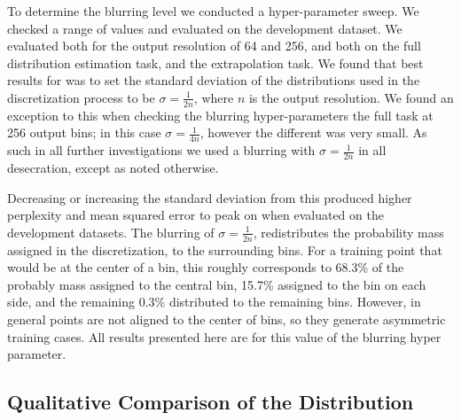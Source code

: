 \documentclass[11pt,letterpaper]{article}
\begin{document}
To determine the blurring level we conducted a hyper-parameter sweep.
We checked a range of values and evaluated on the development dataset.
We evaluated both for the output resolution of 64 and 256, and both on the full distribution estimation task, and the extrapolation task.
We found that best results for was to set the standard deviation of the distributions used in the discretization process to be $\sigma=\frac{1}{2n}$, where $n$ is the output resolution.
We found an exception to this when checking the blurring hyper-parameters the full task at 256 output bins; in this case $\sigma=\frac{1}{4n}$, however the different was very small.
As such in all further investigations we used a blurring with $\sigma=\frac{1}{2n}$ in all desecration, except as noted otherwise.

Decreasing or increasing the standard deviation from this produced higher perplexity and mean squared error to peak on when evaluated on the development datasets.
The blurring of $\sigma=\frac{1}{2n}$, redistributes the probability mass assigned in the discretization, to the surrounding bins.
For a training point that would be at the center of a bin, this roughly corresponds to 68.3\% of the probably mass assigned to the central bin, 15.7\% assigned to the bin on each side, and the remaining 0.3\% distributed to the remaining bins.
However, in general points are not aligned to the center of bins, so they generate asymmetric training cases.
All results presented here are for this value of the blurring hyper parameter.






\subsection{Qualitative Comparison of the Distribution}\label{resultsdistributions}

\end{document}

